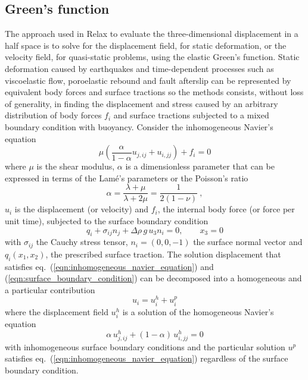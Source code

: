 \documentclass[10pt]{article}
\begin{document}
\subsection{Green's function}
The approach used in Relax to evaluate the three-dimensional displacement in a half space is to solve for the displacement field, for static deformation, or the velocity field, for quasi-static problems, using the elastic Green's function. Static deformation caused by earthquakes and time-dependent processes such as viscoelastic flow, poroelastic rebound and fault afterslip can be represented by equivalent body forces and surface tractions so the methods consists, without loss of generality, in finding the displacement and stress caused by an arbitrary distribution of body forces $f_i$ and surface tractions subjected to a mixed boundary condition with buoyancy. Consider the inhomogeneous Navier's equation
%
\begin{equation}\label{eqn:inhomogeneous_navier_equation}
\mu\left(\frac{\alpha}{1-\alpha}u_{j,ij}+u_{i,jj}\right)+f_i=0
\end{equation}
%
where $\mu$ is the shear modulus, $\alpha$ is a dimensionless parameter that can be expressed in terms of the Lam\'{e}'s parameters or the Poisson's ratio
\begin{equation}
\alpha=\frac{\lambda+\mu}{\lambda+2\mu}=\frac{1}{2(1-\nu)}~,
\end{equation}
$u_i$ is the displacement (or velocity) and $f_i$, the internal body force (or force per unit time), subjected to the surface boundary condition
%
\begin{equation}\label{eqn:surface_boundary_condition}
q_i+\sigma_{ij}n_j+\Delta\rho\,g\,u_3 n_i=0,\qquad x_3=0
\end{equation}
%
with $\sigma_{ij}$ the Cauchy stress tensor, $n_i=(0,0,-1)$ the surface normal vector and $q_i(x_1,x_2)$, the prescribed surface traction. The solution displacement that satisfies eq.~(\ref{eqn:inhomogeneous_navier_equation}) and (\ref{eqn:surface_boundary_condition}) can be decomposed into a homogeneous and a particular contribution
\begin{equation}\label{eqn:decomposition_particular_general}
u_i=u_i^h+u_i^p
\end{equation}
where the displacement field $u_i^h$ is a solution of the homogeneous Navier's equation
%
\begin{equation}\label{eqn:homogeneous_navier}
\alpha\,u^h_{j,ij}+(1-\alpha)\,u^h_{i,jj}=0
\end{equation}
with inhomogeneous surface boundary conditions and the particular solution $u^p$ satisfies eq.~(\ref{eqn:inhomogeneous_navier_equation}) regardless of the surface boundary condition. 
\end{document}
